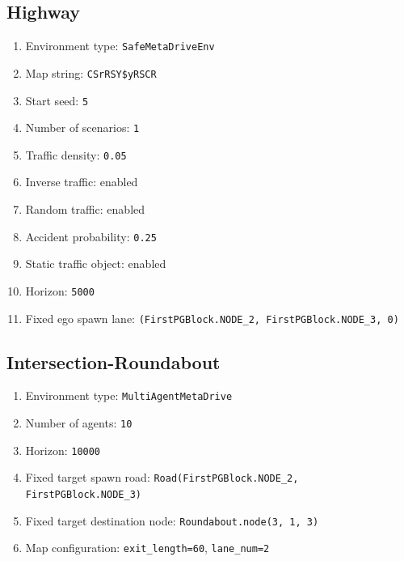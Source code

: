 \documentclass[12pt,a4paper]{report}
\begin{document}
\subsection{Highway}
\begin{enumerate}[label=\arabic*.]
    \item Environment type: \texttt{SafeMetaDriveEnv}
    \item Map string: \texttt{CSrRSY\$yRSCR}
    \item Start seed: \texttt{5}
    \item Number of scenarios: \texttt{1}
    \item Traffic density: \texttt{0.05}
    \item Inverse traffic: enabled
    \item Random traffic: enabled
    \item Accident probability: \texttt{0.25}
    \item Static traffic object: enabled
    \item Horizon: \texttt{5000}
    \item Fixed ego spawn lane: \texttt{(FirstPGBlock.NODE\_2, FirstPGBlock.NODE\_3, 0)}
\end{enumerate}

\subsection{Intersection-Roundabout}
\begin{enumerate}[label=\arabic*.]
    \item Environment type: \texttt{MultiAgentMetaDrive}
    \item Number of agents: \texttt{10}
    \item Horizon: \texttt{10000}
    \item Fixed target spawn road: \texttt{Road(FirstPGBlock.NODE\_2, FirstPGBlock.NODE\_3)}
    \item Fixed target destination node: \texttt{Roundabout.node(3, 1, 3)}
    \item Map configuration: \texttt{exit\_length=60}, \texttt{lane\_num=2}
\end{enumerate}
\end{document}
